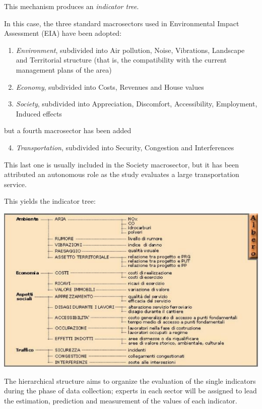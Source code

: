 This mechanism produces an \textit{indicator tree}. 

In this case, the three standard macrosectors used in Environmental Impact Assessment (EIA) have been adopted:
\begin{enumerate}
	\item \textit{Environment}, subdivided into Air pollution, Noise, Vibrations, Landscape and Territorial structure (that is, the compatibility with the current management plans of the area)
	
	\item \textit{Economy}, subdivided into Costs, Revenues and House values
	
	\item \textit{Society}, subdivided into Appreciation, Discomfort, Accessibility, Employment, Induced effects
\end{enumerate}

but a fourth macrosector has been added
\begin{enumerate}
	\setcounter{enumi}{3}
	\item \textit{Transportation}, subdivided into Security, Congestion and Interferences
\end{enumerate}

This last one is usually included in the Society macrosector, but it has been attributed an autonomous role as the study evaluates a large transportation service.

This yields the indicator tree:
\begin{center}
	\includegraphics[width=0.98\columnwidth]{img/dp/cases/comotree}
\end{center}

The hierarchical structure aims to organize the evaluation of the single indicators during the phase of data collection; experts in each sector will be assigned to lead the estimation, prediction and measurement of the values of each indicator. 

